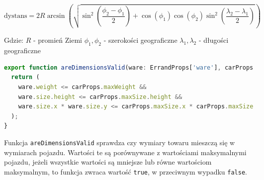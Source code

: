 \begin{equation}
  \text{dystans} = 2R \arcsin\left(\sqrt{\sin^2\left(\frac{\phi_2 - \phi_1}{2}\right) + \cos(\phi_1)\cos(\phi_2)\sin^2\left(\frac{\lambda_2 - \lambda_1}{2}\right)}\right)
\end{equation}

Gdzie: 
$R$ - promień Ziemi
$\phi_1, \phi_2$ - szerokości geograficzne
$\lambda_1, \lambda_2$ - długości geograficzne

{\belowcaptionskip=-9pt
\begin{lstlisting}[language=JavaScript,caption=Funkcja sprawdzająca czy ogłoszenie zawiera się w odpowiednim zakresie właściwości fizycznych towaru , label=lst:areDimensionValid]
export function areDimensionsValid(ware: ErrandProps['ware'], carProps: AnnouncementProps['carProps']): boolean {
  return (
    ware.weight <= carProps.maxWeight &&
    ware.size.height <= carProps.maxSize.height &&
    ware.size.x * ware.size.y <= carProps.maxSize.x * carProps.maxSize.y
  );
}
\end{lstlisting}
}

Funkcja \texttt{areDimensionsValid} sprawdza czy wymiary towaru mieszczą się w wymiarach pojazdu. Wartości te są porównywane z wartościami maksymalnymi pojazdu, jeżeli wszystkie wartości są mniejsze lub równe wartościom maksymalnym, to funkcja zwraca wartość \texttt{true}, w przeciwnym wypadku \texttt{false}.